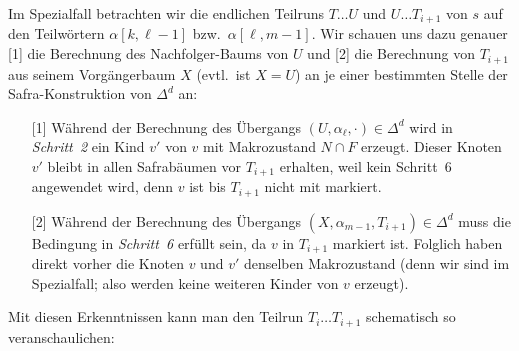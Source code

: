 \documentclass[fontsize=11pt, twoside=false, numbers=autoenddot]{scrbook}
\begin{document}
Im Spezialfall betrachten wir die endlichen Teilruns $T\ldots U$ und $U\ldots T_{i+1}$
von $s$ auf den Teilwörtern $\alpha[k,\ell-1]$ bzw.\ $\alpha[\ell,m-1]$.
Wir schauen uns dazu genauer [1] die Berechnung des Nachfolger-Baums von $U$
und [2] die Berechnung von $T_{i+1}$ aus seinem Vorgängerbaum $X$ (evtl.\ ist $X=U$)
an je einer bestimmten Stelle der Safra-Konstruktion von $\Delta^d$ an:
%
\begin{itemize}
  \item[{[1]}]
    Während der Berechnung des Übergangs $(U,\alpha_\ell,\cdot) \in \Delta^d$
    wird in \emph{Schritt~2} ein Kind $v'$ von $v$ mit Makrozustand $N \cap F$ erzeugt.
    Dieser Knoten $v'$ bleibt in allen Safrabäumen vor $T_{i+1}$ erhalten,
    weil kein Schritt~6 angewendet wird, denn $v$ ist bis $T_{i+1}$ nicht mit \circled{!} markiert.
  \item[{[2]}]
    Während der Berechnung des Übergangs $(X,\alpha_{m-1},T_{i+1}) \in \Delta^d$
    muss die Bedingung in \emph{Schritt~6} erfüllt sein, da $v$ in $T_{i+1}$ markiert ist.
    Folglich haben direkt vorher die Knoten $v$ und $v'$ denselben Makrozustand
    (denn wir sind im Spezialfall; also werden keine weiteren Kinder von $v$ erzeugt).
\end{itemize}
%
Mit diesen Erkenntnissen kann man den Teilrun $T_i \ldots T_{i+1}$ schematisch so veranschaulichen:
%
\end{document}
